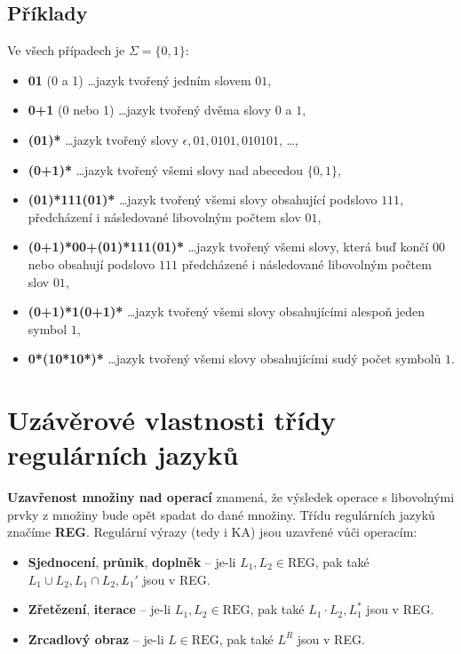 \subsection*{Příklady}
Ve  všech případech je $\Sigma = \{0, 1\}$:
\begin{itemize}
    \item \textbf{01} (0 a 1) \ldots jazyk tvořený jedním slovem $01$,
    \item \textbf{0+1}  (0 nebo 1) \ldots jazyk tvořený dvěma slovy $0$ a $1$,
    \item \textbf{(01)*}  \ldots jazyk tvořený slovy $\epsilon, 01, 0101, 010101$, \ldots,
    \item \textbf{(0+1)*}  \ldots jazyk tvořený všemi slovy nad abecedou $\{0, 1\}$,
    \item \textbf{(01)*111(01)*}  \ldots jazyk tvořený všemi slovy obsahující podslovo $111$, předcházení i následované libovolným počtem  slov $01$,
    \item \textbf{(0+1)*00+(01)*111(01)*} \ldots jazyk tvořený všemi slovy, která buď končí $00$ nebo obsahují podslovo $111$ předcházené i následované libovolným počtem slov $01$,
    \item \textbf{(0+1)*1(0+1)*} \ldots jazyk tvořený všemi slovy obsahujícími alespoň jeden symbol $1$,
    \item \textbf{0*(10*10*)*} \ldots jazyk tvořený všemi slovy obsahujícími sudý počet symbolů $1$.
\end{itemize}

\section{Uzávěrové vlastnosti třídy regulárních jazyků}
\textbf{Uzavřenost množiny nad operací} znamená, že výsledek operace s libovolnými prvky z množiny bude opět spadat do dané množiny. Třídu regulárních jazyků značíme \textbf{REG}. Regulární výrazy (tedy i KA) jsou uzavřené vůči operacím:
\begin{itemize}
    \item \textbf{Sjednocení}, \textbf{průnik}, \textbf{doplněk} -- je-li $L_1, L_2 \in \textrm{REG}$, pak také $L_1 \cup L_2, L_1 \cap L_2, L_1'$ jsou v REG.
    \item \textbf{Zřetězení}, \textbf{iterace} -- je-li $L_1, L_2 \in \textrm{REG}$, pak také $L_1 \cdot L_2, L_1^*$ jsou v REG.
    \item \textbf{Zrcadlový obraz} -- je-li $L \in \textrm{REG}$, pak také $L^R$ jsou v REG.
\end{itemize}

